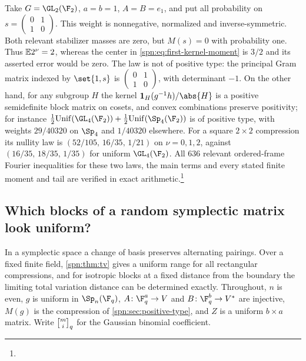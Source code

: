 \begin{example}\label{spn:ex:positive-type}
Take $G=\GL_2(\F_2)$, $a=b=1$, $A=B=e_1$, and put all probability on
$s=\left(\begin{smallmatrix}0&1\\1&0\end{smallmatrix}\right)$. This weight is
nonnegative, normalized and inverse-symmetric. Both relevant stabilizer
masses are zero, but $M(s)=0$ with probability one. Thus $\mathbb{E}2^\nu=2$,
whereas the center in \eqref{spn:eq:first-kernel-moment} is $3/2$ and its
asserted error would be zero. The law is not of positive type: the principal
Gram matrix indexed by $\set{1,s}$ is
$\left(\begin{smallmatrix}0&1\\1&0\end{smallmatrix}\right)$, with determinant
$-1$. On the other hand, for any subgroup $H$ the kernel
$\mathbf 1_H(g^{-1}h)/\abs{H}$ is a positive semidefinite block matrix on
cosets, and convex combinations preserve positivity; for instance
$\tfrac12\mathrm{Unif}(\GL_4(\F_2))+\tfrac12\mathrm{Unif}(\Sp_4(\F_2))$ is
of positive type, with weights $29/40320$ on $\Sp_4$ and $1/40320$
elsewhere. For a square $2\times2$ compression its nullity law is
$(52/105,\,16/35,\,1/21)$ on $\nu=0,1,2$, against $(16/35,\,18/35,\,1/35)$
for uniform $\GL_4(\F_2)$. All $636$ relevant ordered-frame Fourier
inequalities for these two laws, the main terms and every stated finite
moment and tail are verified in exact
arithmetic.\footnote{}
\end{example}

\subsection{Which blocks of a random symplectic matrix look uniform?}\label{spn:sec:symplectic}

In a symplectic space a change of basis preserves alternating pairings. Over
a fixed finite field, \cref{spn:thm:tv} gives a uniform range for all
rectangular compressions, and for isotropic blocks at a fixed distance from
the boundary the limiting total variation distance can be determined
exactly. Throughout, $n$ is even, $g$ is uniform in $\Sp_n(\F_q)$,
$A\colon\F_q^a\to V$ and $B\colon\F_q^b\to V^*$ are injective, $M(g)$ is the
compression of \cref{spn:sec:positive-type}, and $Z$ is a uniform $b\times a$
matrix. Write $\spnqbin{m}{i}{q}$ for the Gaussian binomial coefficient.

